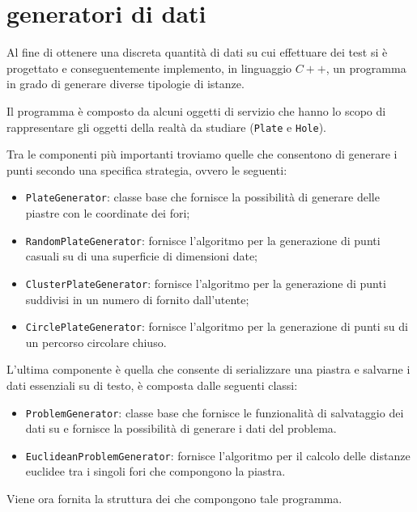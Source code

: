 %
%
\section[Generatori di dati]{generatori di dati}
\label{pt1:generator}
Al fine di ottenere una discreta quantità di dati su cui effettuare dei test si è progettato e conseguentemente implemento, in linguaggio $C++$,
un programma in grado di generare diverse tipologie di istanze.

Il programma è composto da alcuni oggetti di servizio che hanno lo scopo di rappresentare gli oggetti della realtà da studiare (\texttt{Plate} e \texttt{Hole}).

Tra le componenti più importanti troviamo quelle che consentono di generare i punti secondo una specifica strategia, ovvero le seguenti:

\begin{itemize}
\item\texttt{PlateGenerator}: classe base che fornisce la possibilità di generare delle piastre con le coordinate dei fori;
\item\texttt{RandomPlateGenerator}: fornisce l'algoritmo per la generazione di punti casuali su di una superficie di dimensioni date;
\item\texttt{ClusterPlateGenerator}: fornisce l'algoritmo per la generazione di punti suddivisi in un numero di  fornito dall'utente;
\item\texttt{CirclePlateGenerator}: fornisce l'algoritmo per la generazione di punti su di un percorso circolare chiuso.
\end{itemize}

L'ultima componente è quella che consente di serializzare una piastra e salvarne i dati essenziali su  di testo, è composta dalle seguenti classi:

\begin{itemize}
\item\texttt{ProblemGenerator}: classe base che fornisce le funzionalità di salvataggio dei dati su  e fornisce la possibilità di generare i dati del problema.
\item\texttt{EuclideanProblemGenerator}: fornisce l'algoritmo per il calcolo delle distanze euclidee tra i singoli fori che compongono la piastra.
\end{itemize}

Viene ora fornita la struttura dei  che compongono tale programma.

